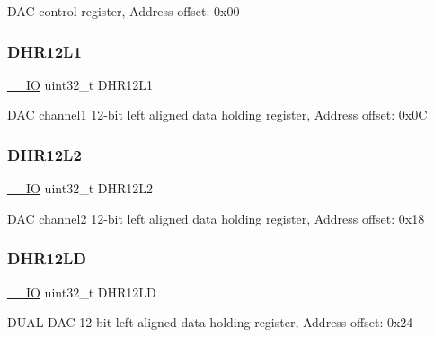D\+AC control register, Address offset\+: 0x00 \mbox{\label{struct_d_a_c___type_def_ae9028b8bcb5118b7073165fb50fcd559}} 
\subsubsection{\texorpdfstring{D\+H\+R12\+L1}{DHR12L1}}
{\footnotesize\ttfamily \hyperlink{core__sc300_8h_aec43007d9998a0a0e01faede4133d6be}{\+\_\+\+\_\+\+IO} uint32\+\_\+t D\+H\+R12\+L1}

D\+AC channel1 12-\/bit left aligned data holding register, Address offset\+: 0x0C \mbox{\label{struct_d_a_c___type_def_a2e45f9c9d67e384187b25334ba0a3e3d}} 
\subsubsection{\texorpdfstring{D\+H\+R12\+L2}{DHR12L2}}
{\footnotesize\ttfamily \hyperlink{core__sc300_8h_aec43007d9998a0a0e01faede4133d6be}{\+\_\+\+\_\+\+IO} uint32\+\_\+t D\+H\+R12\+L2}

D\+AC channel2 12-\/bit left aligned data holding register, Address offset\+: 0x18 \mbox{\label{struct_d_a_c___type_def_acc269320aff0a6482730224a4b641a59}} 
\subsubsection{\texorpdfstring{D\+H\+R12\+LD}{DHR12LD}}
{\footnotesize\ttfamily \hyperlink{core__sc300_8h_aec43007d9998a0a0e01faede4133d6be}{\+\_\+\+\_\+\+IO} uint32\+\_\+t D\+H\+R12\+LD}

D\+U\+AL D\+AC 12-\/bit left aligned data holding register, Address offset\+: 0x24 \mbox{\label{struct_d_a_c___type_def_ac2bb55b037b800a25852736afdd7a258}} 
